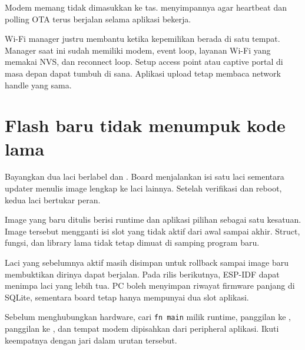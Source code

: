 Modem memang tidak dimasukkan ke tas.  menyimpannya agar heartbeat dan polling OTA terus berjalan selama aplikasi bekerja.

\begin{mentorbox}
Wi-Fi manager justru membantu ketika kepemilikan berada di satu tempat. Manager saat ini sudah memiliki modem, event loop, layanan Wi-Fi yang memakai NVS, dan reconnect loop. Setup access point atau captive portal di masa depan dapat tumbuh di sana. Aplikasi upload tetap membaca network handle yang sama.
\end{mentorbox}

\section{Flash baru tidak menumpuk kode lama}

Bayangkan dua laci berlabel  dan . Board menjalankan isi satu laci sementara updater menulis image lengkap ke laci lainnya. Setelah verifikasi dan reboot, kedua laci bertukar peran.

Image yang baru ditulis berisi runtime dan aplikasi pilihan sebagai satu kesatuan. Image tersebut mengganti isi slot yang tidak aktif dari awal sampai akhir. Struct, fungsi, dan library lama tidak tetap dimuat di samping program baru.

Laci yang sebelumnya aktif masih disimpan untuk rollback sampai image baru membuktikan dirinya dapat berjalan. Pada rilis berikutnya, ESP-IDF dapat menimpa laci yang lebih tua. PC boleh menyimpan riwayat firmware panjang di SQLite, sementara board tetap hanya mempunyai dua slot aplikasi.

\begin{checkpoint}
Sebelum menghubungkan hardware, cari \texttt{fn main} milik runtime, panggilan ke , panggilan ke , dan tempat modem dipisahkan dari peripheral aplikasi. Ikuti keempatnya dengan jari dalam urutan tersebut.
\end{checkpoint}
